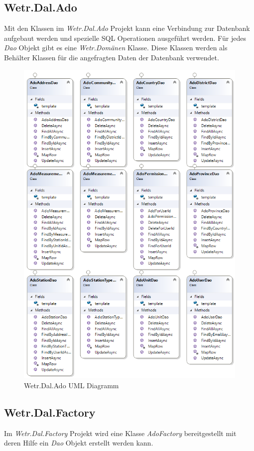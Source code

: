 \newpage
\subsection{Wetr.Dal.Ado}
Mit den Klassen im \textit{Wetr.Dal.Ado} Projekt kann eine Verbindung zur Datenbank aufgebaut werden und spezielle SQL Operationen ausgeführt werden. Für jedes \textit{Dao} Objekt gibt es eine \textit{Wetr.Domänen} Klasse. Diese Klassen werden als Behälter Klassen für die angefragten Daten der Datenbank verwendet.

\begin{figure}[H]
\centering
\includegraphics[width=.8\textwidth]{pictures/Wetr_Dal_Ado.png}
\caption{Wetr.Dal.Ado UML Diagramm}
\label{fig:Wetr.Dal.Ado}
\end{figure}
\raggedright

\subsection{Wetr.Dal.Factory}
Im \textit{Wetr.Dal.Factory} Projekt wird eine Klasse \textit{AdoFactory} bereitgestellt mit deren Hilfe ein \textit{Dao} Objekt erstellt werden kann.

